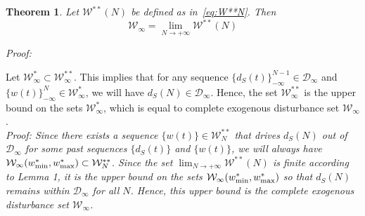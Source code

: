 \documentclass[letterpaper, 10 pt, conference]{ieeeconf}  %
\newtheorem{theorem}{Theorem}
\newcommand{\AB}[1]{\textbf{\color{magenta}{[AB: #1]}}}
\begin{document}
\begin{theorem}
Let $\mathcal{W}^{**}(N)$ be defined as in~\eqref{eq:W**N}. Then
\[
    \mathcal{W}_{\infty} = \lim_{N\rightarrow+\infty}\mathcal{W}^{**}(N)
\]
\end{theorem}
	\textit{Proof:} 
\AB{To be redone, according to new notation and Lemma 1}

{\color{gray}
Let $\mathcal{W}^{*}_{\infty} \subset \mathcal{W}^{**}_{\infty}$. This implies that for any sequence $\{d_S(t)\}_{-\infty}^{N-1} \in \mathcal{D}_{\infty}$ and $\{w(t)\}_{-\infty}^N \in \mathcal{W}^*_{\infty}$, we will have $d_S(N) \in \mathcal{D}_{\infty}$. Hence, the set $\mathcal{W}^{**}_{\infty}$ is the upper bound on the sets $\mathcal{W}^{*}_{\infty}$, which is equal to complete exogenous disturbance set $\mathcal{W}_{\infty}$. 
}\\
	\textit{Proof: Since there exists a sequence $\{w(t)\} \in \mathcal{W}^{**}_{N}$ that drives $d_S(N)$ out of $\mathcal{D}_{\infty}$ for some past sequences $\{d_S(t)\}$ and $\{w(t)\}$, we will always have $\mathcal{W}_{\infty}(w^*_{\rm min},w^*_{\rm max}) \subset \mathcal{W}^{**}_{N}$. Since the set $\lim_{N\rightarrow+\infty}\mathcal{W}^{**}(N)$ is finite according to Lemma 1, it is the upper bound on the sets $\mathcal{W}_{\infty}(w^*_{\rm min},w^*_{\rm max})$ so that $d_S(N)$ remains within $\mathcal{D}_{\infty}$ for all $N$. Hence, this upper bound is the complete exogenous disturbance set $\mathcal{W}_{\infty}$. } \hfill\QED \vspace{-8pt} \\
\end{document}
